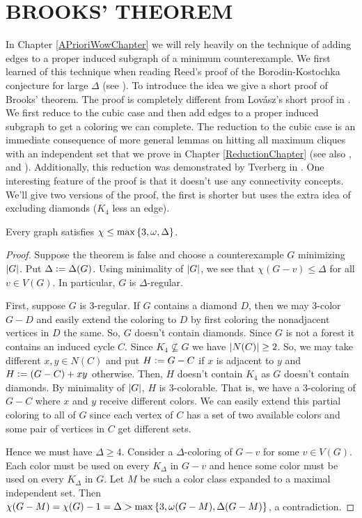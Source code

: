 \chapter{BROOKS' THEOREM}\label{BrooksChapter}

In Chapter \ref{APrioriWowChapter} we will rely heavily on the technique of
adding edges to a proper induced subgraph of a minimum counterexample.  We first
learned of this technique when reading Reed's proof of the Borodin-Kostochka
conjecture for large $\Delta$ (see \cite{reed1999strengthening}). To introduce
the idea we give a short proof of Brooks' theorem. The proof is completely
different from Lov\'{a}sz's short proof in \cite{Lovasz1975269}. We first reduce to the cubic case and then add edges to a proper induced
subgraph to get a coloring we can complete. The reduction to the cubic case is an immediate consequence of more
general lemmas on hitting all maximum cliques with an independent set that we
prove in Chapter \ref{ReductionChapter} (see also \cite{kostochkaRussian},
\cite{rabernhitting} and \cite{KingHitting}). Additionally, this reduction was
demonstrated by Tverberg in \cite{tverberg1983brooks}.  One
interesting feature of the proof is that it doesn't use any connectivity
concepts.
We'll give two versions of the proof, the first is shorter but uses the extra idea of excluding diamonds ($K_4$ less an edge).

\begin{thm}
Every graph satisfies $\chi \leq \max\left\{ 3, \omega, \Delta \right\}$.
\end{thm}
\begin{proof}
Suppose the theorem is false and choose a counterexample $G$ minimizing
$\left|G\right|$.  Put $\Delta \mathrel{\mathop:}= \Delta(G)$. Using minimality of $\left|G\right|$,
we see that $\chi(G - v) \leq \Delta$ for all $v \in
V(G)$. In particular, $G$ is $\Delta$-regular.

First, suppose $G$ is $3$-regular.  If $G$ contains a diamond $D$, then we may $3$-color $G-D$ and easily extend the coloring to $D$ by first coloring the nonadjacent vertices in $D$ the same.  So, $G$ doesn't contain diamonds. Since $G$ is not a forest it contains an induced cycle $C$. Since $K_4 \not
\subseteq G$ we have $\left|N(C)\right| \geq 2$. So, we may take different $x, y \in N(C)$ and put $H \mathrel{\mathop:}= G - C$ if $x$ is adjacent to $y$ and $H \mathrel{\mathop:}= (G-C) + xy$ otherwise.  Then, $H$ doesn't contain $K_4$ as $G$ doesn't contain diamonds. By minimality of $\left|G\right|$, $H$ is $3$-colorable. That is, we have a $3$-coloring of $G - C$ where $x$ and $y$ receive different colors.  We can easily extend this partial
coloring to all of $G$ since each vertex of $C$ has a set of two available
colors and some pair of vertices in $C$ get different sets.  

Hence we must have $\Delta \geq 4$. Consider a $\Delta$-coloring of $G-v$ for some $v \in V(G)$.  Each color must be used on every $K_{\Delta}$ in $G-v$ and hence some color must be used on every $K_{\Delta}$ in $G$.  Let $M$ be such a color class expanded to a maximal independent set.  Then $\chi(G-M) = \chi(G) - 1 = \Delta > \max\left\{ 3, \omega(G-M), \Delta(G-M) \right\}$, a contradiction.
\end{proof}

